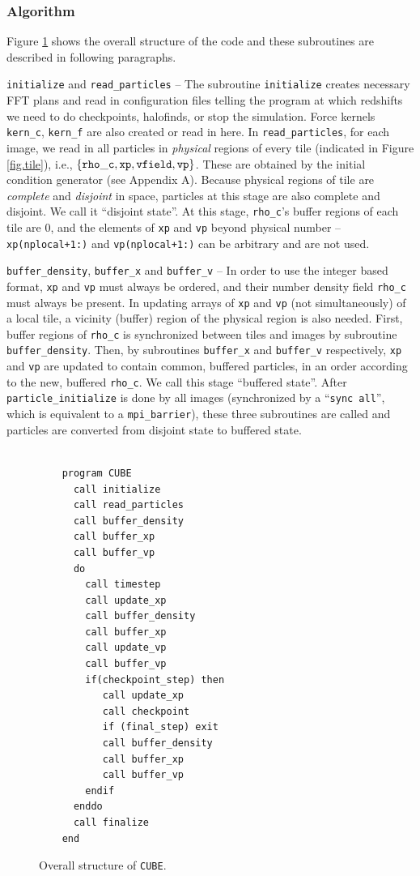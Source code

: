 \documentclass[10pt,twocolumn,preprint]{emulateapj}
\begin{document}
\subsubsection{Algorithm}\label{sss.algorithm}
Figure \ref{fig.code} shows the overall structure of the code and these subroutines are described in following paragraphs. 

{\tt initialize} and {\tt read\_particles} -- The subroutine {\tt initialize} creates necessary FFT plans and read in configuration files telling the program at which redshifts we need to do checkpoints, halofinds, or stop the simulation. Force kernels {\tt kern\_c}, {\tt kern\_f} are also created or read in here. In {\tt read\_particles}, for each image, we read in all particles in {\it physical} regions of every tile (indicated in Figure \ref{fig.tile}), i.e., $\{{\tt rho\_c},{\tt xp},{\tt vfield},{\tt vp}\}$. These are obtained by the initial condition generator (see Appendix A). Because physical regions of tile are {\it complete} and {\it disjoint} in space, particles at this stage are also complete and disjoint. We call it ``disjoint state''. At this stage, {\tt rho\_c}'s buffer regions of each tile are 0, and the elements of {\tt xp} and {\tt vp} beyond physical number -- {\tt xp(nplocal+1:)} and {\tt vp(nplocal+1:)} can be arbitrary and are not used.

{\tt buffer\_density}, {\tt buffer\_x} and {\tt buffer\_v} -- In order to use the integer based format, {\tt xp} and {\tt vp} must always be ordered, and their number density field {\tt rho\_c} must always be present. In updating arrays of {\tt xp} and {\tt vp} (not simultaneously) of a local tile, a vicinity (buffer) region of the physical region is also needed. First, buffer regions of {\tt rho\_c} is synchronized between tiles and images by subroutine {\tt buffer\_density}. Then, by subroutines {\tt buffer\_x} and {\tt buffer\_v} respectively, {\tt xp} and {\tt vp} are updated to contain common, buffered particles, in an order according to the new, buffered {\tt rho\_c}. We call this stage ``buffered state''. After {\tt particle\_initialize} is done by all images (synchronized by a ``{\tt sync all}'', which is equivalent to a {\tt mpi\_barrier}), these three subroutines are called and particles are converted from disjoint state to buffered state.

\begin{figure}[t]
\begin{verbatim}

    program CUBE
      call initialize
      call read_particles
      call buffer_density
      call buffer_xp
      call buffer_vp
      do
        call timestep
        call update_xp
        call buffer_density
        call buffer_xp
        call update_vp
        call buffer_vp
        if(checkpoint_step) then
           call update_xp
           call checkpoint
           if (final_step) exit
           call buffer_density
           call buffer_xp
           call buffer_vp
        endif
      enddo
      call finalize
    end
\end{verbatim}
\caption{Overall structure of {\tt CUBE}.}
\label{fig.code}
\end{figure}
\end{document}
